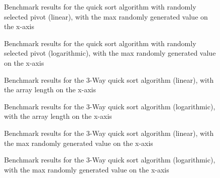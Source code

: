 \begin{multicols}{2}

\begin{figure}[H]
  \centering
  
  \caption{Benchmark results for the quick sort algorithm with randomly selected pivot (linear), with the max randomly generated value on the x-axis}
\end{figure}

\begin{figure}[H]
  \centering
  
  \caption{Benchmark results for the quick sort algorithm with randomly selected pivot (logarithmic), with the max randomly generated value on the x-axis}
\end{figure}

\end{multicols}


\newpage



\begin{multicols}{2}

\begin{figure}[H]
  \centering
  
  \caption{Benchmark results for the 3-Way quick sort algorithm (linear), with the array length on the x-axis}
\end{figure}

\begin{figure}[H]
  \centering
  
  \caption{Benchmark results for the 3-Way quick sort algorithm (logarithmic), with the array length on the x-axis}
\end{figure}

\end{multicols}

\begin{multicols}{2}

\begin{figure}[H]
  \centering
  
  \caption{Benchmark results for the 3-Way quick sort algorithm (linear), with the max randomly generated value on the x-axis}
\end{figure}

\begin{figure}[H]
  \centering
  
  \caption{Benchmark results for the 3-Way quick sort algorithm (logarithmic), with the max randomly generated value on the x-axis}
\end{figure}

\end{multicols}


